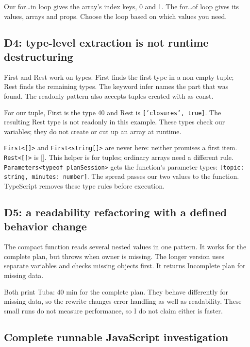 \documentclass[
  10pt,
  a4paper,
]{article}
\begin{document}
Our for\ldots in loop gives the array's index keys, 0 and 1. The
for\ldots of loop gives its values, arrays and props. Choose the loop
based on which values you need.

\subsection{D4: type-level extraction is not runtime
destructuring}\label{d4-type-level-extraction-is-not-runtime-destructuring}

First and Rest work on types. First finds the first type in a non-empty
tuple; Rest finds the remaining types. The keyword infer names the part
that was found. The readonly pattern also accepts tuples created with as
const.

For our tuple, First is the type 40 and Rest is
\texttt{['closures', true]}. The resulting Rest type is not readonly in
this example. These types check our variables; they do not create or cut
up an array at runtime.

\texttt{First<[]>} and \texttt{First<string[]>} are never here: neither
promises a first item. \texttt{Rest<[]>} is {[}{]}. This helper is for
tuples; ordinary arrays need a different rule.
\texttt{Parameters<typeof planSession>} gets the function's parameter
types:
\texttt{[topic:\allowbreak{} string, minutes:\allowbreak{} number]}. The
spread passes our two values to the function. TypeScript removes these
type rules before execution.

\subsection{D5: a readability refactoring with a defined behavior
change}\label{d5-a-readability-refactoring-with-a-defined-behavior-change}

The compact function reads several nested values in one pattern. It
works for the complete plan, but throws when owner is missing. The
longer version uses separate variables and checks missing objects first.
It returns Incomplete plan for missing data.

Both print Tuba: 40 min for the complete plan. They behave differently
for missing data, so the rewrite changes error handling as well as
readability. These small runs do not measure performance, so I do not
claim either is faster.

\subsection{Complete runnable JavaScript
investigation}\label{complete-runnable-javascript-investigation}
\end{document}
